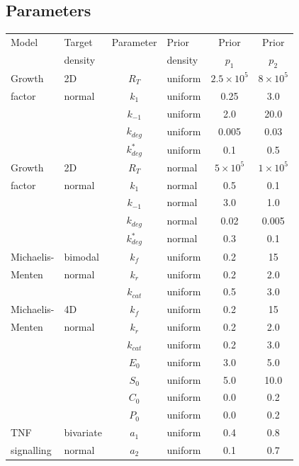 \subsection{Parameters}
\label{sec:parameters}
\begin{table}[H]
\centering
\begin{adjustwidth}{0in}{0in}%
\begin{tabularx}{1.0\textwidth}{llclcc}
Model	& Target  & Parameter & Prior    & Prior  & Prior  \\
        & density &           & density  & $p_1$  & $p_2$  \\
\toprule
Growth  & 2D     & $R_T$       & uniform & $2.5 \times 10^5$ &  $8 \times 10^5$\\
factor  & normal & $k_1$       & uniform & 0.25 & 3.0\\
                && $k_{-1}$    & uniform & 2.0 & 20.0\\
                && $k_{deg}$   & uniform & 0.005 & 0.03\\
                && $k^*_{deg}$ & uniform & 0.1 & 0.5\\
\toprule
Growth  & 2D     & $R_T$ & normal & $5 \times 10^5$ &  $1 \times 10^5$\\
factor  & normal & $k_1$ & normal & 0.5 & 0.1\\
                && $k_{-1}$ & normal & 3.0 & 1.0\\
                && $k_{deg}$ & normal & 0.02 & 0.005\\
                && $k^*_{deg}$ & normal & 0.3 & 0.1\\
\toprule
Michaelis- & bimodal  & $k_f$ & uniform & 0.2 &  15\\
Menten     & normal   & $k_r$ & uniform & 0.2 & 2.0\\
&& $k_{cat}$ & uniform & 0.5 & 3.0\\
\toprule
Michaelis- & 4D    & $k_f$ & uniform & 0.2 &  15\\
Menten     & normal& $k_r$ & uniform & 0.2 & 2.0\\
&& $k_{cat}$ & uniform & 0.2 & 3.0\\
&& $E_0$ & uniform & 3.0 & 5.0\\
&& $S_0$ & uniform & 5.0 & 10.0\\
&& $C_0$ & uniform & 0.0 & 0.2\\
&& $P_0$ & uniform & 0.0 & 0.2\\
\toprule
TNF & bivariate & $a_1$ & uniform & 0.4 & 0.8\\
signalling & normal& $a_2$ & uniform & 0.1 & 0.7\\

\end{tabularx}
\end{adjustwidth}
\end{table}
